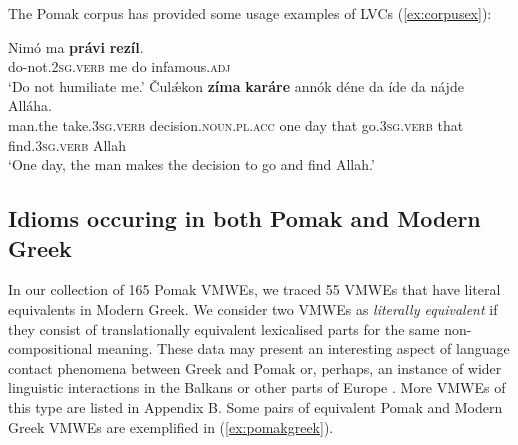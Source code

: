 \documentclass[output=paper,colorlinks,citecolor=brown]{langscibook}
\begin{document}
The Pomak corpus has provided some usage examples of LVCs (\ref{ex:corpusex}):

\ea \label{ex:corpusex}
\begin{xlist}
\ex \label{ex:rezili}
\gll Nimó ma \textbf{{právi}} \textbf{{rezíl}}. \\
{do-not}.\textsc{2sg.verb} me do infamous.\textsc{adj} \\
\glt `Do not humiliate me.'
\ex \label{ex:karare}
\gll Čulǽkon \textbf{{zíma}} \textbf{{karáre}} annók déne da íde da nájde Alláha.\\
man.the  take.\textsc{3sg.verb} decision.\textsc{noun.pl.acc} one day that go.\textsc{3sg.verb}  that find.\textsc{3sg.verb}  Allah\\
\glt `One day, the man makes the decision to go and find Allah.'
\end{xlist}
\z




\subsection{Idioms occuring in both Pomak and Μodern Greek}
\label{sec:idioms}

In our collection of 165 Pomak VMWEs, we traced 55 VMWEs that have literal equivalents in Modern Greek. We consider two VMWEs as \textit{literally equivalent}  if they consist of translationally equivalent lexicalised parts for the same non-compositional meaning.   These data may present an interesting aspect of language contact phenomena between   Greek and   Pomak  or, perhaps, an instance of wider linguistic interactions in the Balkans or other parts of Europe \citep{Piirainen_2005, krimpas2022}.   More VMWEs of this type are listed in Appendix B. Some pairs of equivalent Pomak and Modern Greek VMWEs are exemplified in (\ref{ex:pomakgreek}).\largerpage
\end{document}
